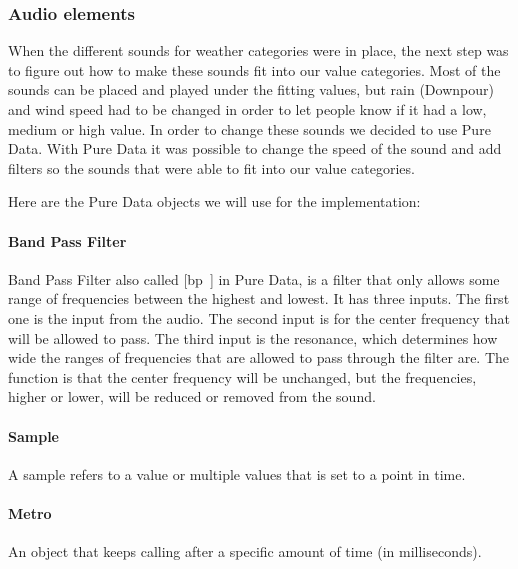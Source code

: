 \subsubsection{Audio elements} %
\label{ssub:audio_elements}

When the different sounds for weather categories were in place, the next step was to figure out how to make these sounds fit into our value categories. 
Most of the sounds can be placed and played under the fitting values, but rain (Downpour) and wind speed had to be changed in order to let people know if it had a low, medium or high value.
In order to change these sounds we decided to use Pure Data.
With Pure Data it was possible to change the speed of the sound and add filters so the sounds that were able to fit into our value categories.

Here are the Pure Data objects we will use for the implementation:

\paragraph{Band Pass Filter} %
\label{par:band_pass_filter}

Band Pass Filter also called [bp~] in Pure Data, is a filter that only allows some range of frequencies between the highest and lowest. 
It has three inputs. 
The first one is the input from the audio. 
The second input is for the center frequency that will be allowed to pass. 
The third input is the resonance, which determines how wide the ranges of frequencies that are allowed to pass through the filter are. 
The function is that the center frequency will be unchanged, but the frequencies, higher or lower, will be reduced or removed from the sound.



\paragraph{Sample} %
\label{par:sample}

A sample refers to a value or multiple values that is set to a point in time.



\paragraph{Metro} %
\label{par:metro}

An object that keeps calling after a specific amount of time (in milliseconds).

